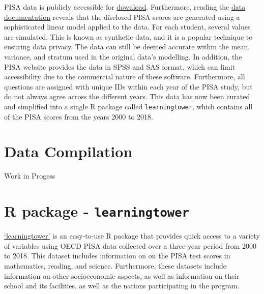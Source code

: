 PISA data is publicly accessible for
\href{https://www.oecd.org/pisa/data/}{download}. Furthermore, reading
the
\href{https://www.oecd.org/pisa/data/pisa2018technicalreport/Ch.09-Scaling-PISA-Data.pdf}{data
documentation} reveals that the disclosed PISA scores are generated
using a sophisticated linear model applied to the data. For each
student, several values are simulated. This is known as synthetic data,
and it is a popular technique to ensuring data privacy. The data can
still be deemed accurate within the mean, variance, and stratum used in
the original data's modelling. In addition, the PISA website provides
the data in SPSS and SAS format, which can limit accessibility due to
the commercial nature of these software. Furthermore, all questions are
assigned with unique IDs within each year of the PISA study, but do not
always agree across the different years. This data has now been curated
and simplified into a single R package called \texttt{learningtower},
which contains all of the PISA scores from the years 2000 to 2018.

\hypertarget{data-compilation}{%
\section{Data Compilation}\label{data-compilation}}

Work in Progess

\hypertarget{r-package---learningtower}{%
\section{\texorpdfstring{R package -
\texttt{learningtower}}{R package - learningtower}}\label{r-package---learningtower}}

\href{https://cran.r-project.org/web/packages/learningtower/index.html}{`learningtower'}
is an easy-to-use R package that provides quick access to a variety of
variables using OECD PISA data collected over a three-year period from
2000 to 2018. This dataset includes information on on the PISA test
scores in mathematics, reading, and science. Furthermore, these datasets
include information on other socioeconomic aspects, as well as
information on their school and its facilities, as well as the nations
participating in the program.

